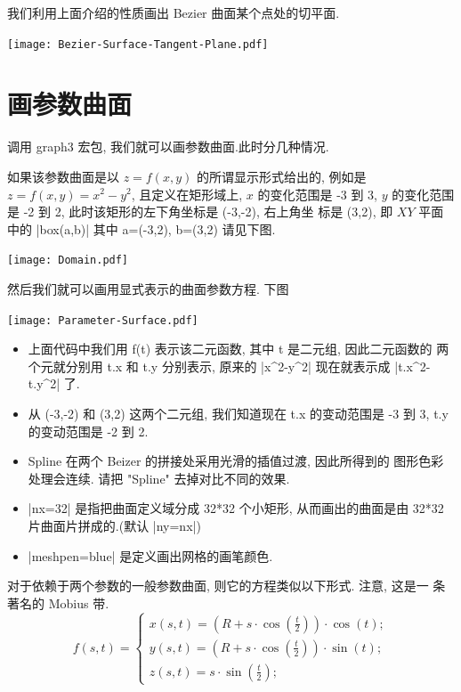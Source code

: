 \documentclass[nofonts,CJKnormalspaces]{ctexbook}
\begin{document}
我们利用上面介绍的性质画出 Bezier 曲面某个点处的切平面.
\begin{center}\texttt{[image: Bezier-Surface-Tangent-Plane.pdf]}\end{center}%


\section{画参数曲面}
调用 graph3 宏包, 我们就可以画参数曲面.此时分几种情况.

如果该参数曲面是以 $z=f(x,y)$ 的所谓显示形式给出的, 例如是
$z=f(x,y)=x^2-y^2$, 且定义在矩形域上, $x$ 的变化范围是 -3 到 3,
$y$ 的变化范围是 -2 到 2, 此时该矩形的左下角坐标是 (-3,-2), 右上角坐
标是 (3,2), 即 $XY$ 平面中的 |box(a,b)| 其中 a=(-3,2), b=(3,2) 请见下图.
\begin{center}\texttt{[image: Domain.pdf]}\end{center}%

然后我们就可以画用显式表示的曲面参数方程. 下图
\begin{center}\texttt{[image: Parameter-Surface.pdf]}\end{center}%

\begin{itemize}
\item 上面代码中我们用 f(t) 表示该二元函数, 其中 t 是二元组, 因此二元函数的
  两个元就分别用 t.x 和 t.y 分别表示, 原来的 |x^2-y^2| 现在就表示成
  |t.x^2-t.y^2| 了.
\item 从 (-3,-2) 和 (3,2) 这两个二元组, 我们知道现在 t.x 的变动范围是
  -3 到 3, t.y 的变动范围是 -2 到 2.
\item Spline  在两个 Beizer 的拼接处采用光滑的插值过渡, 因此所得到的
  图形色彩处理会连续. 请把 "Spline" 去掉对比不同的效果.
\item |nx=32| 是指把曲面定义域分成 32*32 个小矩形, 从而画出的曲面是由
  32*32 片曲面片拼成的.(默认 |ny=nx|)
\item |meshpen=blue| 是定义画出网格的画笔颜色.
\end{itemize}
对于依赖于两个参数的一般参数曲面, 则它的方程类似以下形式. 注意, 这是一
条著名的 Mobius 带.
\begin{equation}
  f(s,t)=\left\{
    \begin{array}{ll}
      x(s,t)=(R+s\cdot\cos(\frac{t}{2}))\cdot\cos(t);\\
      y(s,t)=(R+s\cdot\cos(\frac{t}{2}))\cdot\sin(t);\\
      z(s,t)=s\cdot\sin(\frac{t}{2});
    \end{array}\right.
\end{equation}
\end{document}
